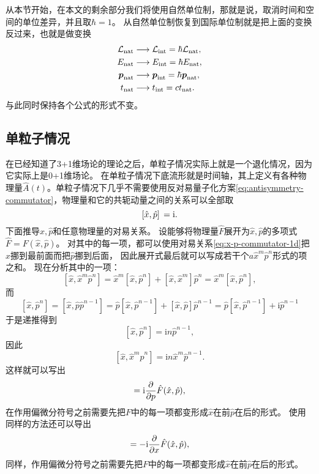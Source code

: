 \documentclass[hyperref, UTF8, a4paper]{ctexart}
\newcommand*{\ii}{\mathrm{i}}
\begin{document}
从本节开始，在本文的剩余部分我们将使用自然单位制，那就是说，取消时间和空间的单位差异，并且取$\hbar = 1$。
从自然单位制恢复到国际单位制就是把上面的变换反过来，也就是做变换
\[
    \begin{aligned}
        \mathcal{L}_\text{nat} &\longrightarrow \mathcal{L}_\text{int} = \hbar \mathcal{L}_\text{nat}, \\
        E_\text{nat} &\longrightarrow E_\text{int} = \hbar E_\text{nat} , \\
        \vb*{p}_\text{nat} &\longrightarrow \vb*{p}_\text{int} = \hbar \vb*{p}_\text{nat}, \\
        t_\text{nat} &\longrightarrow t_\text{int} = c t_\text{nat}.
    \end{aligned}
\]
与此同时保持各个公式的形式不变。

\subsection{单粒子情况}

在已经知道了3+1维场论的理论之后，单粒子情况实际上就是一个退化情况，因为它实际上是0+1维场论。
在单粒子情况下底流形就是时间轴，其上定义有各种物理量$\hat{A}(t)$。单粒子情况下几乎不需要使用反对易量子化方案\eqref{eq:antisymmetry-commutator}，物理量和它的共轭动量之间的关系可以全部取
\begin{equation}
    \comm*{\hat{x}}{\hat{p}} = \ii.
\end{equation}
下面推导$\hat{x}, \hat{p}$和任意物理量的对易关系。
设能够将物理量$\hat{F}$展开为$\hat{x}, \hat{p}$的多项式$\hat{F} = F(\hat{x}, \hat{p})$。
对其中的每一项，都可以使用对易关系\eqref{eq:x-p-commutator-1d}把$\hat{x}$挪到最前面而把$\hat{p}$挪到后面，
因此展开式最后就可以写成若干个$a \hat{x}^m \hat{p}^n$形式的项之和。
现在分析其中的一项：
\[
    [\hat{x}, \hat{x}^m \hat{p}^n] = \hat{x}^m [\hat{x}, \hat{p}^n] + [\hat{x}, \hat{x}^m] \hat{p}^n = \hat{x}^m [\hat{x}, \hat{p}^n],
\]
而
\[
    [\hat{x}, \hat{p}^n] = [\hat{x}, \hat{p} \hat{p}^{n-1}] = 
    \hat{p} [\hat{x}, \hat{p}^{n-1}] + [\hat{x}, \hat{p}] \hat{p}^{n-1} = \hat{p} [\hat{x}, \hat{p}^{n-1}] + \ii \hat{p}^{n-1}
\]
于是递推得到
\[
    [\hat{x}, \hat{p}^n] = \ii n \hat{p}^{n-1},
\]
因此
\[
    [\hat{x}, \hat{x}^m \hat{p}^n] = \ii n \hat{x}^m \hat{p}^{n-1}.
\]
这样就可以写出
\begin{equation}
    [\hat{x}, \hat{F}(\hat{x}, \hat{p})] = \ii \pdv{p} \hat{F}(\hat{x}, \hat{p}),
\end{equation}
在作用偏微分符号之前需要先把$F$中的每一项都变形成$\hat{x}$在前$\hat{p}$在后的形式。
使用同样的方法还可以导出
\begin{equation}
    [\hat{p}, \hat{F}(\hat{x}, \hat{p})] = - \ii \pdv{x} \hat{F}(\hat{x}, \hat{p}),
\end{equation}
同样，作用偏微分符号之前需要先把$F$中的每一项都变形成$\hat{x}$在前$\hat{p}$在后的形式。
\end{document}
